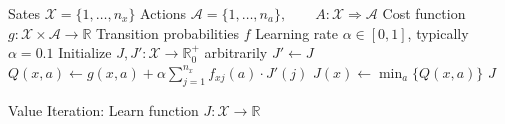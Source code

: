 \documentclass{article}
\begin{document}
\begin{preview}
    \begin{algorithm}[H]
        \begin{algorithmic}
        \Require
        \Statex Sates $\mathcal{X} = \{1, \dots, n_x\}$
        \Statex Actions $\mathcal{A} = \{1, \dots, n_a\},\qquad A: \mathcal{X} \Rightarrow \mathcal{A}$
        \Statex Cost function $g: \mathcal{X} \times \mathcal{A} \rightarrow \mathbb{R}$
        \Statex Transition probabilities $f$
        \Statex Learning rate $\alpha \in [0, 1]$, typically $\alpha = 0.1$
            \State Initialize $J, J': \mathcal{X} \rightarrow \mathbb{R}_0^+$ arbitrarily
                \State $J' \gets J$
                        \State $Q(x, a) \gets g(x, a) + \alpha \sum_{j=1}^{n_x} f_{xj}(a) \cdot J'(j)$
                    \EndFor
                \EndFor
                    \State $J(x) \gets \min_a \{Q(x, a)\}$
                \EndFor
            \EndWhile
            \Return $J$
        \EndProcedure
        \end{algorithmic}
    \caption{Value Iteration: Learn function $J: \mathcal{X} \rightarrow \mathbb{R}$}
    \label{alg:value-iteration}
    \end{algorithm}
\end{preview}
\end{document}
